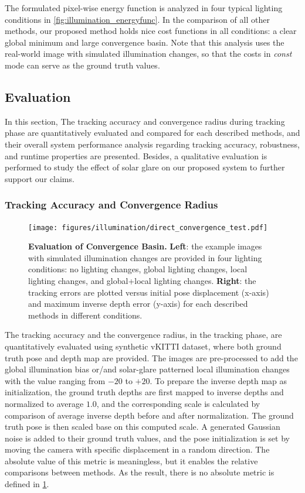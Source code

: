 The formulated pixel-wise energy function is analyzed in four typical lighting conditions in \ref{fig:illumination_energyfunc}. In the comparison of all other methods, our proposed method holds nice cost functions in all conditions: a clear global minimum and large convergence basin. Note that this analysis uses the real-world image with simulated illumination changes, so that the costs in {\em const} mode can serve as the ground truth values. 

\subsection{Evaluation}
In this section, The tracking accuracy and convergence radius during tracking phase are quantitatively evaluated and compared for each described methods, and their overall system performance analysis regarding tracking accuracy, robustness, and runtime properties are presented. 
Besides, a qualitative evaluation is performed to study the effect of solar glare on our proposed system to further support our claims.
  
\subsubsection{Tracking Accuracy and Convergence Radius }

\begin{figure}[t] 
	\centering
	\texttt{[image: figures/illumination/direct\_convergence\_test.pdf]}
	\caption[Evaluation of Convergence Basin]{\textbf{Evaluation of Convergence Basin.} \textbf{Left}: the example images with simulated illumination changes are provided in four lighting conditions: no lighting changes, global lighting changes, local lighting changes, and global+local lighting changes. \textbf{Right}: the tracking errors are plotted versus initial pose displacement (x-axis) and maximum inverse depth error (y-axis) for each described methods in different conditions. 
	\label{fig:illumination_convergence}}
\end{figure}

The tracking accuracy and the convergence radius, in the tracking phase, are quantitatively evaluated using synthetic vKITTI dataset, where both ground truth pose and depth map are provided. 
The images are pre-processed to add the global illumination bias or/and solar-glare patterned local illumination changes with the value ranging from $-20$ to $+20$. 
To prepare the inverse depth map as initialization, the ground truth depths are first mapped to inverse depths and normalized to average $1.0$, and the corresponding scale is calculated by comparison of average inverse depth before and after normalization. 
The ground truth pose is then scaled base on this computed scale. A generated Gaussian noise is added to their ground truth values, and the pose initialization is set by moving the camera with specific displacement in a random direction. 
The absolute value of this metric is meaningless, but it enables the relative comparisons between methods. 
As the result, there is no absolute metric is defined in \ref{fig:illumination_convergence}.

